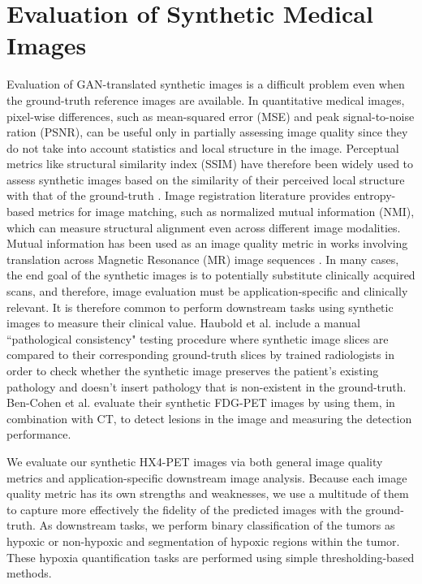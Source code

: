\section{Evaluation of Synthetic Medical Images}

Evaluation of GAN-translated synthetic images is a difficult problem even when the ground-truth reference images are available. In quantitative medical images, pixel-wise differences, such as mean-squared error (MSE) and peak signal-to-noise ration (PSNR), can be useful only in partially assessing image quality since they do not take into account statistics and local structure in the image. Perceptual metrics like structural similarity index (SSIM) have therefore been widely used to assess synthetic images based on the similarity of their perceived local structure with that of the ground-truth \cite{yi2019generative}. Image registration literature provides entropy-based metrics for image matching, such as normalized mutual information (NMI), which can measure structural alignment even across different image modalities. Mutual information has been used as an image quality metric in works involving translation across Magnetic Resonance (MR) image sequences \cite{yang2018mri, welander2018generative}. In many cases, the end goal of the synthetic images is to potentially substitute clinically acquired scans, and therefore, image evaluation must be application-specific and clinically relevant. It is therefore common to perform downstream tasks using synthetic images to measure their clinical value. Haubold et al. \cite{haubold2021contrast} include a manual ``pathological consistency" testing procedure where synthetic image slices are compared to their corresponding ground-truth slices by trained radiologists in order to check whether the synthetic image preserves the patient's existing pathology and doesn't insert pathology that is non-existent in the ground-truth. Ben-Cohen et al. \cite{bencohen2018crossmodality} evaluate their synthetic FDG-PET images by using them, in combination with CT, to detect lesions in the image and measuring the detection performance. 

We evaluate our synthetic HX4-PET images via both general image quality metrics and application-specific downstream image analysis. Because each image quality metric has its own strengths and weaknesses, we use a multitude of them to capture more effectively the fidelity of the predicted images with the ground-truth. As downstream tasks, we perform binary classification of the tumors as hypoxic or non-hypoxic and segmentation of hypoxic regions within the tumor. These hypoxia quantification tasks are performed using simple thresholding-based methods.